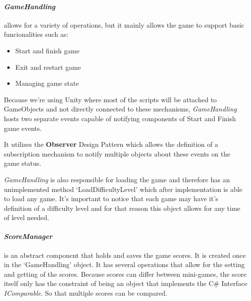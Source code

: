 

\newpage
\paragraph{\textit{GameHandling}} allows for a variety of operations, but it mainly allows the game to support basic funcionalities such as:

\vspace{-\topsep}  %
\begin{itemize}
    \setlength{\itemsep}{8pt}  %
    \setlength{\parskip}{0pt}  %
    \item Start and finish game
    \item Exit and restart game
    \item Managing game state
\end{itemize}
\vspace{-\topsep}  %

Because we're using Unity where most of the scripts will be attached to GameObjects and not directly connected to these mechanisms, \textit{GameHandling} hosts two separate events capable of notifying components of Start and Finish game events.

It utilizes the \textbf{Observer} Design Pattern \cite{observer} which allows the definition of a subscription mechanism to notify multiple objects about these events on the game status.

\textit{GameHandling} is also responsible for loading the game and therefore has an unimplemented method `LoadDifficultyLevel' which after implementation is able to load any game. It's important to notice that each game may have it's definition of a difficulty level and for that reason this object allows for any time of level needed.

\paragraph{\textit{ScoreManager}} is an abstract component that holds and saves the game scores. It is created once in the `GameHandling' object. It has several operations that allow for the setting and getting of the scores. Because scores can differ between mini-games, the score itself only has the constraint of being an object that implements the C\# Interface \textit{IComparable}. So that multiple scores can be compared.


